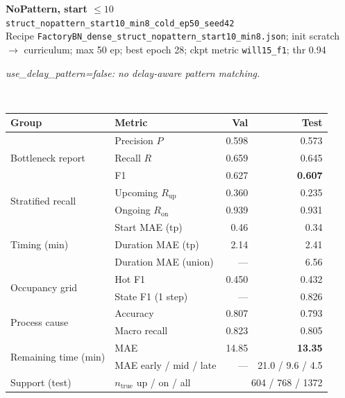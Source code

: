 \documentclass[9pt,a4paper,twocolumn]{extarticle}
\begin{document}
\noindent\begin{minipage}{\columnwidth}
\begin{center}
{\small\bfseries NoPattern, start $\le 10$}\\
{\scriptsize\texttt{struct\_nopattern\_start10\_min8\_cold\_ep50\_seed42}}\\
{\scriptsize Recipe \texttt{FactoryBN\_dense\_struct\_nopattern\_start10\_min8.json}; init scratch $\to$ curriculum; max 50 ep; best epoch 28; ckpt metric \texttt{will15\_f1}; thr 0.94}\\[1pt]
\parbox{0.96\columnwidth}{\scriptsize\itshape use\_delay\_pattern=false: no delay-aware pattern matching.}\\[2pt]
\scriptsize\setlength{\tabcolsep}{3pt}
\begin{tabular}{llrr}
\toprule
Group & Metric & Val & Test \\
\midrule
\multirow{3}{*}{Bottleneck report}
  & Precision $P$ & 0.598 & 0.573 \\
  & Recall $R$ & 0.659 & 0.645 \\
  & F1 & 0.627 & \textbf{0.607} \\
\midrule
\multirow{2}{*}{Stratified recall}
  & Upcoming $R_{\mathrm{up}}$ & 0.360 & 0.235 \\
  & Ongoing $R_{\mathrm{on}}$ & 0.939 & 0.931 \\
\midrule
\multirow{3}{*}{Timing (min)}
  & Start MAE (tp) & 0.46 & 0.34 \\
  & Duration MAE (tp) & 2.14 & 2.41 \\
  & Duration MAE (union) & --- & 6.56 \\
\midrule
\multirow{2}{*}{Occupancy grid}
  & Hot F1 & 0.450 & 0.432 \\
  & State F1 (1 step) & --- & 0.826 \\
\midrule
\multirow{2}{*}{Process cause}
  & Accuracy & 0.807 & 0.793 \\
  & Macro recall & 0.823 & 0.805 \\
\midrule
\multirow{2}{*}{Remaining time (min)}
  & MAE & 14.85 & \textbf{13.35} \\
  & MAE early / mid / late & --- & 21.0 / 9.6 / 4.5 \\
\midrule
Support (test)
  & $n_{\mathrm{true}}$ up / on / all & \multicolumn{2}{r}{604 / 768 / 1372} \\
\bottomrule
\end{tabular}
\end{center}
\end{minipage}\par\vspace{6pt}
\end{document}
